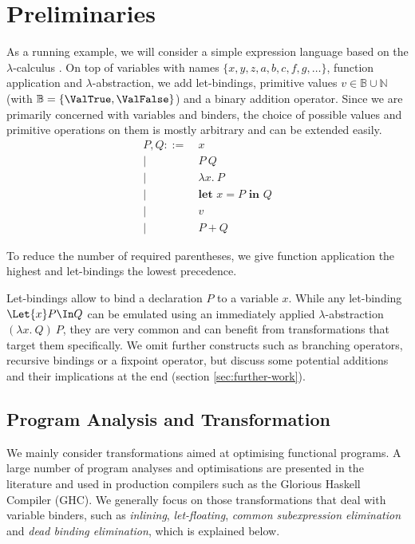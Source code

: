 \chapter{Preliminaries}
\label{ch:preliminaries}
    As a running example, we will consider a simple expression language
    based on the $\lambda$-calculus
    \cite{Barendregt1985LambdaCalculus}.
    On top of variables with names $\{ x, y, z, a, b, c, f, g, \ldots \}$, function application and $\lambda$-abstraction,
    we add let-bindings, primitive values $v \in \mathbb{B} \cup \mathbb{N}$ (with $\mathbb{B} = \{ \ValTrue , \ValFalse \}$) and a binary addition operator.
    Since we are primarily concerned with variables and binders,
    the choice of possible values and primitive operations on them is mostly arbitrary and can be extended easily.
    \begin{align*}
      P, Q ::=&\ x
      \\ \big|&\ P\ Q
      \\ \big|&\ \lambda x.\ P
      \\ \big|&\ \textbf{let } x = P \textbf{ in } Q
      \\ \big|&\ v
      \\ \big|&\ P + Q
    \end{align*}

    To reduce the number of required parentheses,
    we give function application the highest
    and let-bindings the lowest precedence.

    Let-bindings allow to bind a declaration $P$ to a variable $x$.
    While any let-binding $\Let{x} P \In Q$ can be emulated
    using an immediately applied $\lambda$-abstraction $(\lambda x.\ Q)\ P$,
    they are very common and can benefit
    from transformations that target them specifically.
    We omit further constructs such as branching operators,
    recursive bindings or a fixpoint operator,
    but discuss some potential additions and their implications
    at the end (section \ref{sec:further-work}).

\section{Program Analysis and Transformation}
\label{sec:program-transformations}
    We mainly consider transformations aimed at optimising functional programs.
    A large number of program analyses and optimisations are presented in the literature
    \cite{Nielson1999PrinciplesProgramAnalysis}
    \cite{Santos1995CompilationByTransformation}
    and used in production compilers such as the Glorious Haskell Compiler (GHC).
    We generally focus on those transformations that deal with variable binders,
    such as
    \emph{inlining},
    \emph{let-floating},
    \emph{common subexpression elimination} and
    \emph{dead binding elimination},
    which is explained below.

